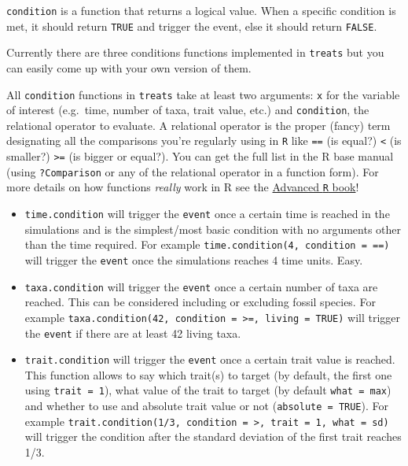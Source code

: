 \documentclass[
]{book}
\providecommand{\tightlist}{%
  \setlength{\itemsep}{0pt}\setlength{\parskip}{0pt}}
\begin{document}
\texttt{condition} is a function that returns a logical value. When a specific condition is met, it should return \texttt{TRUE} and trigger the event, else it should return \texttt{FALSE}.

Currently there are three conditions functions implemented in \texttt{treats} but you can easily come up with your own version of them.

All \texttt{condition} functions in \texttt{treats} take at least two arguments: \texttt{x} for the variable of interest (e.g.~time, number of taxa, trait value, etc.) and \texttt{condition}, the relational operator to evaluate. A relational operator is the proper (fancy) term designating all the comparisons you're regularly using in \texttt{R} like \texttt{==} (is equal?) \texttt{\textless{}} (is smaller?) \texttt{\textgreater{}=} (is bigger or equal?). You can get the full list in the R base manual (using \texttt{?Comparison} or any of the relational operator in a function form). For more details on how functions \emph{really} work in R see the \href{https://adv-r.hadley.nz/functions.html}{Advanced \texttt{R} book}!

\begin{itemize}
\tightlist
\item
  \texttt{time.condition} will trigger the \texttt{event} once a certain time is reached in the simulations and is the simplest/most basic condition with no arguments other than the time required. For example \texttt{time.condition(4,\ condition\ =\ \textasciigrave{}==\textasciigrave{})} will trigger the \texttt{event} once the simulations reaches 4 time units. Easy.
\item
  \texttt{taxa.condition} will trigger the \texttt{event} once a certain number of taxa are reached. This can be considered including or excluding fossil species. For example \texttt{taxa.condition(42,\ condition\ =\ \textasciigrave{}\textgreater{}=\textasciigrave{},\ living\ =\ TRUE)} will trigger the \texttt{event} if there are at least 42 living taxa.
\item
  \texttt{trait.condition} will trigger the \texttt{event} once a certain trait value is reached. This function allows to say which trait(s) to target (by default, the first one using \texttt{trait\ =\ 1}), what value of the trait to target (by default \texttt{what\ =\ max}) and whether to use and absolute trait value or not (\texttt{absolute\ =\ TRUE}). For example \texttt{trait.condition(1/3,\ condition\ =\ \textasciigrave{}\textgreater{}\textasciigrave{},\ trait\ =\ 1,\ what\ =\ sd)} will trigger the condition after the standard deviation of the first trait reaches 1/3.
\end{itemize}
\end{document}
